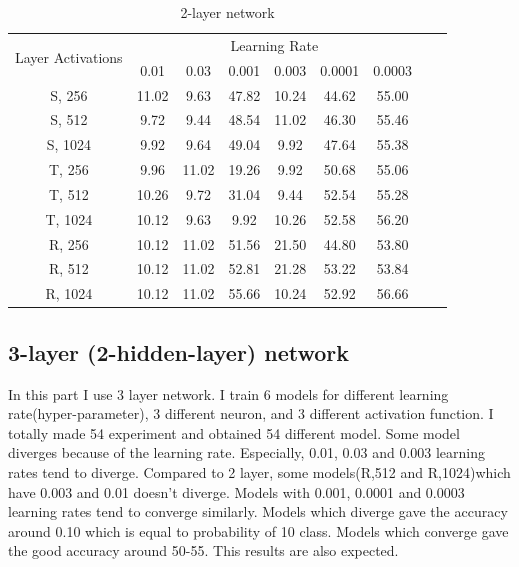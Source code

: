 \documentclass{article}
\begin{document}
\begin{table}[htbp]
    \centering
    \begin{tabular}{|c|c|c|c|c|c|c|c|c|}
    \hline
    \multirow{2}{5em}{Layer Activations} & \multicolumn{6}{c|}{Learning Rate} \\
        & 0.01 & 0.03 & 0.001 & 0.003 & 0.0001 & 0.0003 \\
        \hline \hline
        S, 256  & 11.02 & 9.63 & 47.82 & 10.24 & 44.62 & 55.00 \\
        S, 512  & 9.72 & 9.44 & 48.54 & 11.02 & 46.30 & 55.46 \\
        S, 1024  & 9.92 & 9.64 & 49.04 & 9.92 & 47.64 & 55.38 \\
        T, 256  & 9.96 & 11.02 & 19.26 & 9.92 & 50.68 & 55.06 \\
        T, 512  & 10.26 & 9.72 & 31.04 & 9.44 & 52.54 & 55.28 \\
        T, 1024  & 10.12 & 9.63 & 9.92 & 10.26 & 52.58 & 56.20 \\
        R, 256  & 10.12 & 11.02 & 51.56 & 21.50 & 44.80 & 53.80 \\
        R, 512  & 10.12 & 11.02 & 52.81 & 21.28 & 53.22 & 53.84 \\
        R, 1024  & 10.12 & 11.02 & 55.66 & 10.24 & 52.92 & 56.66 \\
        \hline
    \end{tabular}
    \caption{2-layer network}
    \label{tab:2layer}
\end{table}


\newpage
\subsection{3-layer (2-hidden-layer) network}

In this part I use 3 layer network. I train 6 models for different learning rate(hyper-parameter), 3 different neuron, and 3 different activation function. I totally made 54 experiment and obtained 54 different model. Some model diverges because of the learning rate. Especially, 0.01, 0.03 and 0.003 learning rates tend to diverge. Compared to 2 layer, some models(R,512 and R,1024)which have 0.003 and 0.01 doesn't diverge.  Models with 0.001, 0.0001 and 0.0003 learning rates tend to converge similarly. Models which diverge gave the accuracy around 0.10 which is equal to probability of 10 class. Models which converge gave the good accuracy around 50-55. This results are also expected. \\
\end{document}
